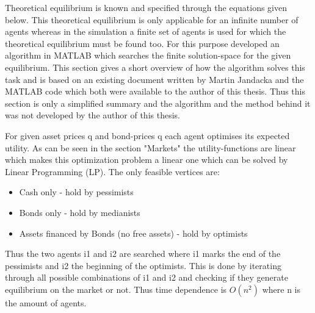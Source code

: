 \documentclass[Bachelorarbeit.tex]{subfiles}
\begin{document}
Theoretical equilibrium is known and specified through the equations given below. This theoretical equilibrium is only applicable for an infinite number of agents whereas in the simulation a finite set of agents is used for which the theoretical equilibrium must be found too. For this purpose \cite{Breuer2015} developed an algorithm in MATLAB which searches the finite solution-space for the given equilibrium. This section gives a short overview of how the algorithm solves this task and is based on an existing document written by Martin Jandacka and the MATLAB code which both were available to the author of this thesis. Thus this section is only a simplified summary and the algorithm and the method behind it was not developed by the author of this thesis.

\medskip

For given asset prices q and bond-prices q each agent optimises its expected utility. As can be seen in the section "Markets" the utility-functions are linear which makes this optimization problem a linear one which can be solved by Linear Programming (LP). The only feasible vertices are:

\begin{itemize}
\item Cash only - hold by pessimists
\item Bonds only - hold by medianists
\item Assets financed by Bonds (no free assets) - hold by optimists 
\end{itemize}

Thus the two agents i1 and i2 are searched where i1 marks the end of the pessimists and i2 the beginning of the optimists. This is done by iterating through all possible combinations of i1 and i2 and checking if they generate equilibrium on the market or not. Thus time dependence is $O(n^2)$ where n is the amount of agents. 
\end{document}

